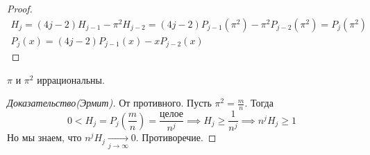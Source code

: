 \begin{enumerate}
\begin{proof}
        \begin{equation*}
          \begin{gathered}
            H_j = (4j - 2)H_{j - 1} - \pi^2H_{j - 2} = (4j - 2)P_{j - 1}(\pi^2) -
            \pi^2P_{j - 2}(\pi^2) = P_j(\pi^2)\\
            P_j(x) = (4j - 2)P_{j - 1}(x) - xP_{j - 2}(x)
          \end{gathered}
        \end{equation*}
      \end{proof}
    \end{enumerate}
    
    \begin{theorem}[Ламберта]
        $\pi$ и $\pi^2$ иррациональны.
    \end{theorem}
    \begin{proof}[Доказательство(Эрмит)]
        От противного. Пусть $\pi^2 = \frac{m}{n}$. Тогда
        \begin{equation*}
            0 < H_j = P_j(\frac{m}{n}) = \frac{\text{целое}}{n^{j}} \implies
            H_j \geq \frac{1}{n^j} \implies n^{j}H_{j} \geq 1
        \end{equation*}
        Но мы знаем, что $n^jH_j \underset{j \to \infty}{\longrightarrow} 0$. Противоречие.
    \end{proof}
  